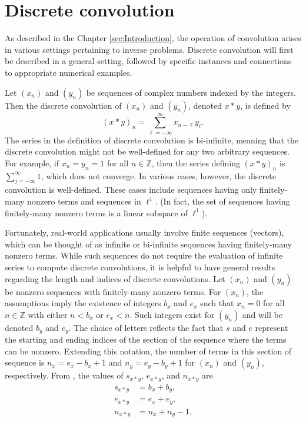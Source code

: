 \documentclass[12pt,notitlepage]{report}
\begin{document}
\section{Discrete convolution} \label{sec:Discrete convolution}
As described in the Chapter \ref{sec:Introduction}, the operation of convolution arises in various settings pertaining to inverse problems. Discrete convolution will first be described  in a general setting, followed by specific instances and connections to appropriate numerical examples. \par
Let $(x_n)$ and $(y_n)$ be sequences of complex numbers indexed by the integers. Then the discrete convolution of $(x_n)$ and $(y_n)$, denoted $x*y$, is defined by
\[(x*y)_n = \sum_{\ell=-\infty}^\infty x_{n-\ell}y_\ell.\]
The series in the definition of discrete convolution is bi-infinite, meaning that the discrete convolution might not be well-defined for any two arbitrary sequences. For example, if $x_n = y_n = 1$ for all $n \in \mathbb{Z}$, then the series defining $(x*y)_n$ is $\sum_{j=-\infty}^\infty 1$, which does not converge. In various cases, however, the discrete convolution is well-defined. These cases include sequences having only finitely-many nonzero terms and sequences in $\ell^1$. (In fact, the set of sequences having finitely-many nonzero terms is a linear subspace of $\ell^1$).  \par 
Fortunately, real-world applications usually involve finite sequences (vectors), which can be thought of as infinite or bi-infinite sequences having finitely-many nonzero terms. While such sequences do not require the evaluation of infinite series to compute discrete convolutions, it is helpful to have general results regarding the length and indices of discrete convolutions. Let $(x_n)$ and $(y_n)$ be nonzero sequences with finitely-many nonzero terms. For $(x_n)$, the assumptions imply the existence of integers $b_x$ and $e_x$ such that $x_n = 0$ for all $n \in \mathbb{Z}$ with either $n < b_x$ or $e_x < n$. Such integers exist for $(y_n)$ and will be denoted $b_y$ and $e_y$. The choice of letters reflects the fact that $s$ and $e$ represent the starting and ending indices of the section of the sequence where the terms can be nonzero. Extending this notation, the number of terms in this section of sequence is $n_x = e_x - b_x + 1$ and $n_y = e_y - b_y + 1$ for $(x_n)$ and $(y_n)$, respectively. From \cite{BoggessNarcowich2009}, the values of $s_{x*y}$, $e_{x*y}$, and $n_{x*y}$ are
\begin{align}
s_{x*y} &= b_x + b_y, \nonumber \\
e_{x*y} &= e_x + e_y, \label{eq:ConResults} \\
n_{x*y} &= n_x + n_y - 1. \nonumber
\end{align}
\end{document}
